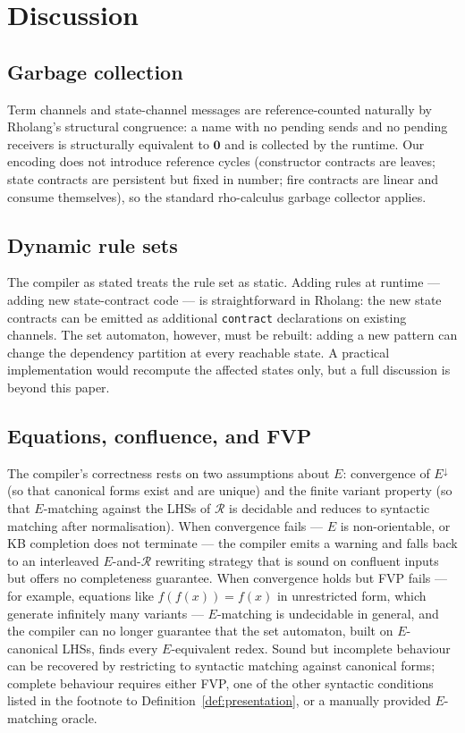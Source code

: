 \documentclass[11pt]{article}
\theoremstyle{plain}
\theoremstyle{definition}
\theoremstyle{remark}
\newcommand{\nil}{\mathbf{0}}
\begin{document}
\section{Discussion}\label{sec:discussion}

\subsection{Garbage collection}

Term channels and state-channel messages are reference-counted naturally
by Rholang's structural congruence: a name with no pending sends and no
pending receivers is structurally equivalent to $\nil$ and is collected
by the runtime. Our encoding does not introduce reference cycles
(constructor contracts are leaves; state contracts are persistent but
fixed in number; fire contracts are linear and consume themselves), so
the standard rho-calculus garbage collector applies.

\subsection{Dynamic rule sets}

The compiler as stated treats the rule set as static. Adding rules at
runtime --- adding new state-contract code --- is straightforward in
Rholang: the new state contracts can be emitted as additional
\texttt{contract} declarations on existing channels. The set automaton,
however, must be rebuilt: adding a new pattern can change the dependency
partition at every reachable state. A practical implementation would
recompute the affected states only, but a full discussion is beyond
this paper.

\subsection{Equations, confluence, and FVP}

The compiler's correctness rests on two assumptions about $E$:
convergence of $E^{\downarrow}$ (so that canonical forms exist and are
unique) and the finite variant property (so that $E$-matching against
the LHSs of $\mathcal{R}$ is decidable and reduces to syntactic
matching after normalisation). When convergence fails --- $E$ is
non-orientable, or KB completion does not terminate --- the compiler
emits a warning and falls back to an interleaved $E$-and-$\mathcal{R}$
rewriting strategy that is sound on confluent inputs but offers no
completeness guarantee. When convergence holds but FVP fails --- for
example, equations like $f(f(x)) = f(x)$ in unrestricted form, which
generate infinitely many variants --- $E$-matching is undecidable in
general, and the compiler can no longer guarantee that the set
automaton, built on $E$-canonical LHSs, finds every $E$-equivalent
redex. Sound but incomplete behaviour can be recovered by restricting
to syntactic matching against canonical forms; complete behaviour
requires either FVP, one of the other syntactic conditions listed in
the footnote to Definition~\ref{def:presentation}, or a manually
provided $E$-matching oracle.
\end{document}
